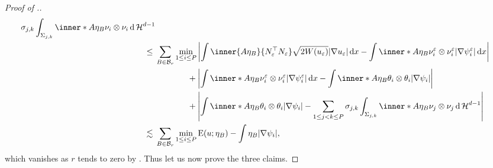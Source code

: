 \begin{proof}[Proof of .]
\begin{align*}
{				\sigma_{ j , k }
				\int_{ \Sigma_{ j , k } }
					\inner*{ A \eta_{ B } }
					{ \nu_{ i } \otimes \nu_{i } }
				\dd{ \hm^{ d - 1 } }
		}
		\\
		\leq{} &
		\sum_{ B \in \mathcal{ B }_{ r } }
			\min_{ 1 \leq i \leq P }
				\abs{ 
					\int
						\inner{ A \eta_{ B } }{ N_{ \varepsilon }^{ \top } N_{ \varepsilon } }
						\sqrt{ 2 W ( u_{ \varepsilon } ) }
						\abs{ \nabla u_{ \varepsilon } }
					\dd{ x }
					-
					\int
						\inner*{ A \eta_{ B } }
						{ \nu_{ i }^{ \varepsilon } \otimes \nu_{ i }^{ 
						\varepsilon } }
						\abs{ \nabla \psi_{ i }^{ \varepsilon } }
					\dd{ x }
				}
			\\
			& \quad \quad \quad \;\;\;\!\: +
			\abs{ 
				\int
					\inner*{ A \eta_{ B } }{ \nu_{ i }^{ \varepsilon } \otimes \nu_{ i }^{ \varepsilon } }
					\abs{ \nabla \psi_{ i }^{ \varepsilon } }
				\dd{ x }
				-
				\int
					\inner*{ A \eta_{ B } }
					{ \theta_{ i } \otimes \theta_{ i } }
				\abs{ \nabla \psi_{ i } }
			}
			\\
			& \quad \quad \quad \;\;\;\!\: +
			\abs{ 
				\int
					\inner*{ A \eta_{ B } }
					{ \theta_{ i } \otimes \theta_{ i } }
				\abs{ \nabla \psi_{ i } }
				-
				\sum_{ 1 \leq j < k \leq P }
					\sigma_{ j , k }
					\int_{ \Sigma_{ j , k } }
						\inner*{ A \eta_{ B } }
						{ \nu_{ j } \otimes \nu_{ j } }
					\dd{ \hm^{ d - 1 } }
			}
		\\
		\lesssim {} &
			\sum_{ B \in \mathcal{ B }_{ r } }
				\min_{ 1 \leq i \leq P }
					\energy ( u ; \eta_{ B } )
					-
					\int
						\eta_{ B }
					\abs{ \nabla \psi_{ i } },
	\end{align*}
	which vanishes as $ r $ tends to zero by 
	.
	Thus let us now prove the three claims.
	

\end{proof}
